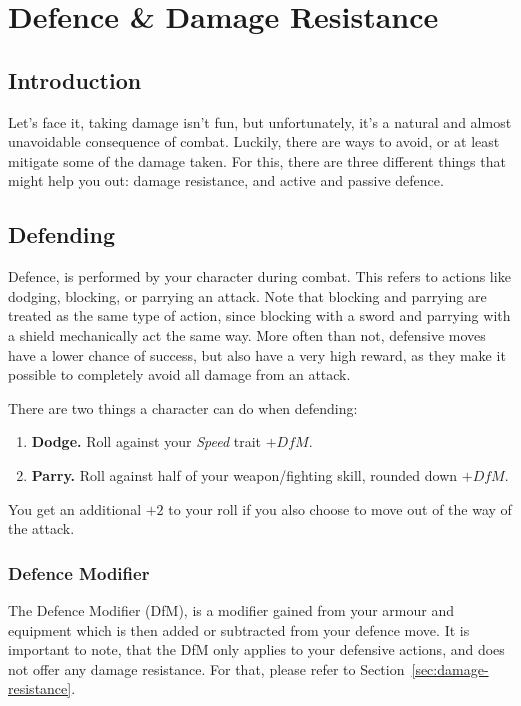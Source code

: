 \chapter{Defence \& Damage Resistance}\label{chap:defence}
\section{Introduction}
Let's face it, taking damage isn't fun, but unfortunately, it's a natural and almost unavoidable consequence of combat.
Luckily, there are ways to avoid, or at least mitigate some of the damage taken.
For this, there are three different things that might help you out: damage resistance, and active and passive defence.


\section{Defending}
Defence, is performed by your character during combat.
This refers to actions like dodging, blocking, or parrying an attack.
Note that blocking and parrying are treated as the same type of action, since blocking with a sword and parrying with a shield mechanically act the same way.
More often than not, defensive moves have a lower chance of success, but also have a very high reward, as they make it possible to completely avoid all damage from an attack.

There are two things a character can do when defending:
\begin{enumerate}
    \item \textbf{Dodge.} Roll against your \textit{Speed} trait $+ \mathit{DfM}$.
    \item \textbf{Parry.} Roll against half of your weapon/fighting skill, rounded down $+ \mathit{DfM}$.
\end{enumerate}
You get an additional $+2$ to your roll if you also choose to move out of the way of the attack.

\subsection{Defence Modifier}
The Defence Modifier (DfM), is a modifier gained from your armour and equipment which is then added or subtracted from your defence move.
It is important to note, that the DfM only applies to your defensive actions, and does not offer any damage resistance. 
For that, please refer to Section~\ref{sec:damage-resistance}.

